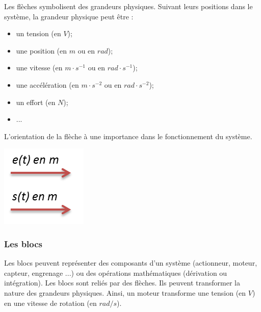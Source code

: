 \documentclass[11pt,oneside]{article}
\begin{document}
\begin{minipage}[c]{.7\linewidth}
Les flèches symbolisent des grandeurs physiques. Suivant leurs positions dans le système, la grandeur physique peut être :
\begin{itemize}
\item un tension (en $V$);
\item une position (en $m$ ou en $rad$);
\item une vitesse (en $m\cdot s^{-1}$ ou en $rad\cdot s^{-1}$);
\item une accélération (en $m\cdot s^{-2}$ ou en $rad\cdot s^{-2}$);
\item un effort (en $N$);
\item ...
\end{itemize}
L'orientation de la flèche à une importance dans le fonctionnement du système.
\end{minipage}\hfill
\begin{minipage}[c]{.2\linewidth}
\begin{center}
    \includegraphics[width=.7\textwidth]{png/fleche2}
\end{center}
\end{minipage}

\subsubsection*{Les blocs}

Les blocs peuvent représenter des composants d'un système (actionneur, moteur, capteur, engrenage ...) ou des opérations mathématiques (dérivation ou intégration). Les blocs sont reliés par des flèches. Ils peuvent transformer la nature des grandeurs physiques. Ainsi, un moteur transforme une tension (en $V$) en une vitesse de rotation (en $rad/s$).
\end{document}
